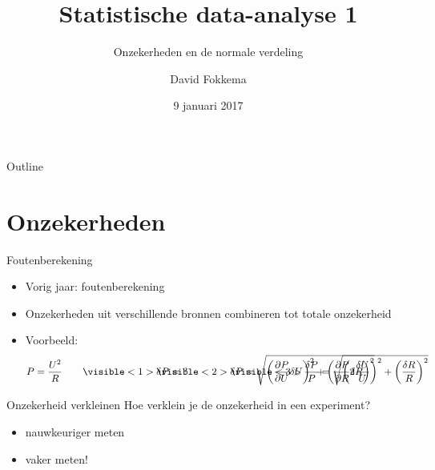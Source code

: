 \documentclass{beamer}
\title{Statistische data-analyse 1}
\subtitle{Onzekerheden en de normale verdeling}
\author{David Fokkema}
\institute{
  Practicum natuurkunde \\
  Vrije Universiteit / Universiteit van Amsterdam
}
\date{9 januari 2017}
\begin{document}
\begin{frame}
  \titlepage
\end{frame}

\begin{frame}{Outline}
  \tableofcontents
\end{frame}




\section{Onzekerheden}

\begin{frame}{Foutenberekening}
  \begin{itemize}
    \item Vorig jaar: foutenberekening
    \item Onzekerheden uit verschillende bronnen combineren tot totale onzekerheid
    \item Voorbeeld:
    \begin{equation*}
        P = \frac{U^2}{R} \qquad
        \visible<1>
        {\mathrlap{\delta P = \ ?}}
        \visible<2>
        {\mathrlap{\delta P = \sqrt{\left(\frac{\partial P}{\partial U}\delta U\right)^2 + \left(\frac{\partial P}{\partial R}\delta R\right)^2}}}
        \visible<3>
        {\frac{\delta P}{P} = \sqrt{\left(2\frac{\delta U}{U}\right)^2 + \left(\frac{\delta R}{R}\right)^2}}
    \end{equation*}
  \end{itemize}
\end{frame}

\begin{frame}{Onzekerheid verkleinen}
  Hoe verklein je de onzekerheid in een experiment?
  \begin{itemize}
    \item nauwkeuriger meten
    \item<2-> \alert{vaker} meten!
  \end{itemize}
\end{frame}
\end{document}
